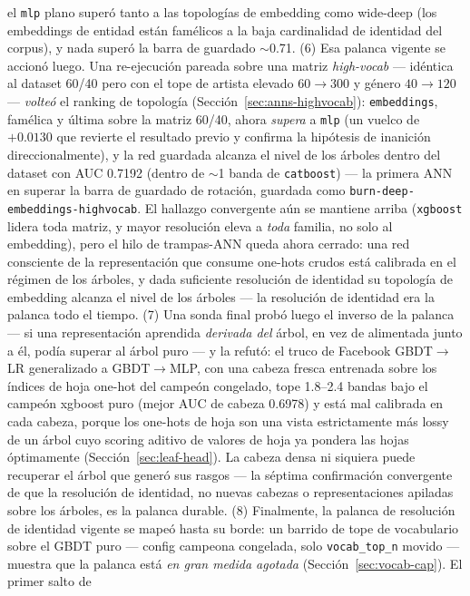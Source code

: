 \documentclass[11pt]{article}
\begin{document}
el \texttt{mlp} plano superó tanto a las topologías de embedding como wide-deep (los
embeddings de entidad están famélicos a la baja cardinalidad de identidad del
corpus), y nada superó la barra de guardado $\sim$0.71. (6) Esa palanca vigente se
accionó luego. Una re-ejecución pareada sobre una matriz \emph{high-vocab} ---
idéntica al dataset 60/40 pero con el tope de artista elevado $60\to300$ y género
$40\to120$ --- \emph{volteó} el ranking de topología (Sección~\ref{sec:anns-highvocab}):
\texttt{embeddings}, famélica y última sobre la matriz 60/40, ahora \emph{supera} a
\texttt{mlp} (un vuelco de $+0.0130$ que revierte el resultado previo y confirma la
hipótesis de inanición direccionalmente), y la red guardada alcanza el nivel de los
árboles dentro del dataset con AUC \num{0.7192} (dentro de $\sim$1 banda de
\texttt{catboost}) --- la primera ANN en superar la barra de guardado de rotación,
guardada como \texttt{burn-deep-embeddings-highvocab}. El hallazgo convergente aún
se mantiene arriba (\texttt{xgboost} lidera toda matriz, y mayor resolución eleva a
\emph{toda} familia, no solo al embedding), pero el hilo de trampas-ANN queda ahora
cerrado: una red consciente de la representación que consume one-hots crudos está
calibrada en el régimen de los árboles, y dada suficiente resolución de identidad su
topología de embedding alcanza el nivel de los árboles --- la resolución de
identidad era la palanca todo el tiempo.
(7) Una sonda final probó luego el inverso de la palanca --- si una representación
aprendida \emph{derivada del} árbol, en vez de alimentada junto a él, podía superar
al árbol puro --- y la refutó: el truco de Facebook GBDT$\to$LR generalizado a
GBDT$\to$MLP, con una cabeza fresca entrenada sobre los índices de hoja one-hot del
campeón congelado, tope \num{1.8}--\num{2.4} bandas bajo el campeón xgboost puro
(mejor AUC de cabeza \num{0.6978}) y está mal calibrada en cada cabeza, porque los
one-hots de hoja son una vista estrictamente más lossy de un árbol cuyo scoring
aditivo de valores de hoja ya pondera las hojas óptimamente
(Sección~\ref{sec:leaf-head}). La cabeza densa ni siquiera puede recuperar el árbol
que generó sus rasgos --- la séptima confirmación convergente de que la resolución
de identidad, no nuevas cabezas o representaciones apiladas sobre los árboles, es la
palanca durable.
(8) Finalmente, la palanca de resolución de identidad vigente se mapeó hasta su
borde: un barrido de tope de vocabulario sobre el GBDT puro --- config campeona
congelada, solo \texttt{vocab\_top\_n} movido --- muestra que la palanca está
\emph{en gran medida agotada} (Sección~\ref{sec:vocab-cap}). El primer salto de
\end{document}
